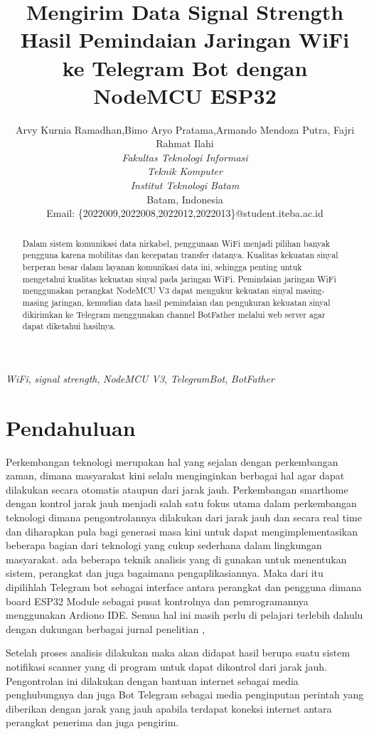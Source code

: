 \documentclass[conference]{IEEEtran}
\title{Mengirim Data Signal Strength Hasil Pemindaian Jaringan WiFi ke Telegram Bot dengan NodeMCU ESP32}
\author{Arvy Kurnia Ramadhan\IEEEauthorrefmark{1},Bimo Aryo Pratama\IEEEauthorrefmark{2},Armando Mendoza Putra\IEEEauthorrefmark{3}, Fajri Rahmat Ilahi\IEEEauthorrefmark{4}\\
\textit{Fakultas Teknologi Informasi}\\
\textit{Teknik Komputer}\\
\textit{Institut Teknologi Batam}\\
Batam, Indonesia\\
Email: \{\IEEEauthorrefmark{1}2022009,\IEEEauthorrefmark{2}2022008,\IEEEauthorrefmark{3}2022012,\IEEEauthorrefmark{4}2022013\}@student.iteba.ac.id}
\begin{document}
\maketitle
\begin{abstract}
    Dalam sistem komunikasi data nirkabel, penggunaan WiFi menjadi pilihan banyak pengguna karena mobilitas dan kecepatan transfer datanya. Kualitas kekuatan sinyal berperan besar dalam layanan komunikasi data ini, sehingga penting untuk mengetahui kualitas kekuatan sinyal pada jaringan WiFi. Pemindaian jaringan WiFi menggunakan perangkat NodeMCU V3 dapat mengukur kekuatan sinyal masing-masing jaringan, kemudian data hasil pemindaian dan pengukuran kekuatan sinyal dikirimkan ke Telegram menggunakan channel BotFather melalui web server agar dapat diketahui hasilnya.
\end{abstract}
\vspace{0.2cm}
\begin{IEEEkeywords}
    \emph{WiFi}, \emph{signal strength}, \emph{NodeMCU V3}, \emph{TelegramBot}, \emph{BotFather}
\end{IEEEkeywords}
\section{Pendahuluan}
Perkembangan teknologi merupakan hal yang sejalan dengan 
perkembangan zaman, dimana masyarakat kini selalu
menginginkan berbagai hal agar dapat dilakukan secara otomatis
ataupun dari jarak jauh. Perkembangan smarthome dengan
kontrol jarak jauh menjadi salah satu fokus utama dalam
perkembangan teknologi dimana pengontrolannya dilakukan dari
jarak jauh dan secara real time dan diharapkan pula bagi generasi
masa kini untuk dapat mengimplementasikan beberapa bagian
dari teknologi yang cukup sederhana dalam lingkungan masyarakat. ada
beberapa teknik analisis yang di gunakan untuk menentukan
sistem, perangkat dan juga bagaimana pengaplikasiannya. Maka
dari itu dipilihlah Telegram bot sebagai interface antara perangkat
dan pengguna dimana board ESP32 Module sebagai pusat
kontrolnya dan pemrogramannya menggunakan Ardiono IDE.
Semua hal ini masih perlu di pelajari terlebih dahulu dengan
dukungan berbagai jurnal penelitian ,
    
    Setelah proses analisis dilakukan maka akan didapat hasil
berupa suatu sistem notifikasi scanner yang di program untuk dapat
dikontrol dari jarak jauh. Pengontrolan ini dilakukan dengan
bantuan internet sebagai media penghubungnya dan juga Bot
Telegram sebagai media penginputan perintah yang diberikan
dengan jarak yang jauh apabila terdapat koneksi internet 
antara perangkat penerima dan juga pengirim.
\end{document}
